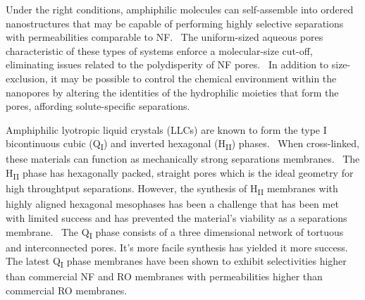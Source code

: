 \documentclass[journal=jpcbfk,manuscript=article]{achemso}
\begin{document}


  Under the right conditions, amphiphilic molecules can self-assemble into
  ordered nanostructures that may be capable of performing highly selective
  separations with permeabilities comparable to
  NF.~\cite{alexandridis_amphiphilic_2000} The uniform-sized aqueous pores
  characteristic of these types of systems enforce a molecular-size cut-off,
  eliminating issues related to the polydisperity of NF
  pores.~\cite{zhou_supported_2005} In addition to size-exclusion, it may be
  possible to control the chemical environment within the nanopores by altering
  the identities of the hydrophilic moieties that form the pores, affording
  solute-specific separations.~\cite{dischinger_effect_2017}

  Amphiphilic lyotropic liquid crystals (LLCs) are known to form the type I
  bicontinuous cubic (Q\textsubscript{I}) and inverted hexagonal (H\textsubscript{II})
  phases.~\cite{smith_ordered_1997,dischinger_application_2017,carter_glycerol-based_2012,hatakeyama_nanoporous_2010}
  When cross-linked, these materials can function as mechanically strong
  separations membranes.~\cite{zhou_supported_2005} The H\textsubscript{II} phase
  has hexagonally packed, straight pores which is the ideal geometry for high
  throughtput separations. However, the synthesis of H\textsubscript{II}
  membranes with highly aligned hexagonal mesophases has been a challenge that
  has been met with limited success and has prevented the material's viability as
  a separations membrane.~\cite{feng_scalable_2014,feng_thin_2016} The
  Q\textsubscript{I} phase consists of a three dimensional network of tortuous
  and interconnected pores.  It's more facile synthesis has yielded it more
  success. The latest Q\textsubscript{I} phase membranes have been shown to
  exhibit selectivities higher than commercial NF and RO membranes with permeabilities
  higher than commercial RO membranes.~\cite{dischinger_application_2017}
\end{document}
